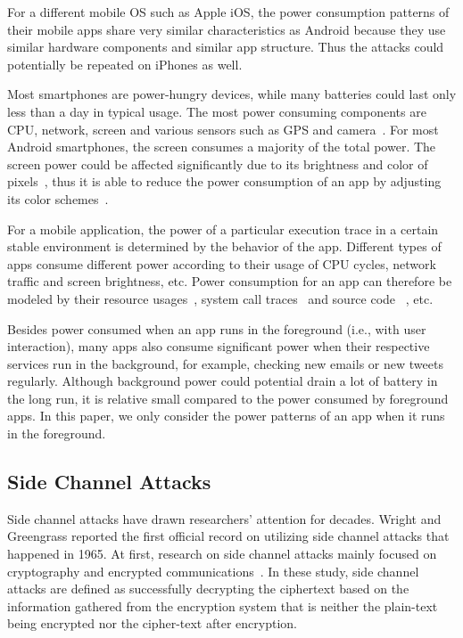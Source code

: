 \documentclass{sig-alternate}
\begin{document}
For a different mobile OS such as Apple iOS, the power consumption patterns of their mobile apps share very similar characteristics as Android because they use similar hardware components and similar app structure. Thus the attacks could potentially be repeated on iPhones as well.

Most smartphones are power-hungry devices, while many batteries could last only less than a day in typical usage. The most power consuming components are CPU, network, screen and various sensors such as GPS and camera~\cite{carroll2010analysis}. For most Android smartphones, the screen consumes a majority of the total power. The screen power could be affected significantly due to its brightness and color of pixels~\cite{dong2012oled}, thus it is able to reduce the power consumption of an app by adjusting its color schemes~\cite{li2014making}.

For a mobile application, the power of a particular execution trace in a certain stable environment is determined by the behavior of the app. Different types of apps consume different power according to their usage of CPU cycles, network traffic and screen brightness, etc. Power consumption for an app can therefore be modeled by their resource usages~\cite{yoon2012appscope}, system call traces~\cite{yetim2012eprof} and source code ~\cite{hao2013estimating}, etc.

Besides power consumed when an app runs in the foreground (i.e., with user interaction), many apps also consume significant power when their respective services run in the background, for example, checking new emails or new tweets regularly. Although background power could potential drain a lot of battery in the long run, it is relative small compared to the power consumed by foreground apps. In this paper, we only consider the power patterns of an app when it runs in the foreground.

\subsection{Side Channel Attacks}
Side channel attacks have drawn researchers' attention for decades.  Wright and Greengrass \cite{wright:spycatcher} reported the first official record on utilizing side channel attacks that happened in 1965.  At first, research on side channel attacks mainly focused on cryptography \cite{kocher:timing, biham:differential, kocher:introduction} and encrypted communications~\cite{Song:2001, Brumley:2003, Saponas:2007, Wright:2008}. In these study, side channel attacks are defined as successfully decrypting the ciphertext based on the information gathered from the encryption system that is neither the plain-text being encrypted nor the cipher-text after encryption.
\end{document}
